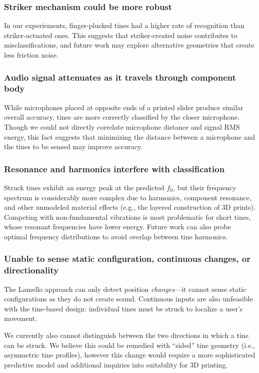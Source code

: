     \subsubsection{Striker mechanism could be more robust}
    In our experiements, finger-plucked tines had a higher rate of recognition than striker-actuated ones. This suggests that striker-created noise contributes to misclassifications, and future work may explore alternative geometries that create less friction noise.

    \subsubsection{Audio signal attenuates as it travels through component body}
    While microphones placed at opposite ends of a printed slider produce similar overall accuracy, tines are more correctly classified by the closer microphone. Though we could not directly correlate microphone distance and signal RMS energy, this fact suggests that minimizing the distance between a microphone and the tines to be sensed may improve accuracy.

    \subsubsection{Resonance and harmonics interfere with classification}
    Struck tines exhibit an energy peak at the predicted $f_0$, but their frequency spectrum is considerably more complex due to harmonics, component resonance, and other unmodeled material effects (e.g., the layered construction of 3D prints). Competing with non-fundamental vibrations is most problematic for short tines, whose resonant frequencies have lower energy. Future work can also probe optimal frequency distributions to avoid overlap between tine harmonics.

    \subsubsection{Unable to sense static configuration, continuous changes, or directionality}

    The Lamello approach can only detect position \emph{changes}---it cannot sense static configurations as they do not create sound. Continuous inputs are also unfeasible with the tine-based design: individual tines must be struck to localize a user's movement.
    
    We currently also cannot distinguish between the two directions in which a tine can be struck. We believe this could be remedied with ``sided'' tine geometry (i.e., asymmetric tine profiles), however this change would require a more sophisticated predictive model and additional inquiries into suitability for 3D printing.
    
